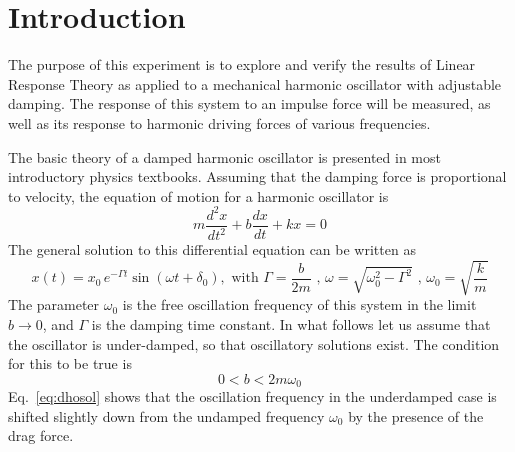 \documentclass{revtex4}
\begin{document}
%
%
%

\section{Introduction}

The purpose of this experiment is to explore and verify the results of
Linear Response Theory as applied to a mechanical harmonic oscillator with
adjustable damping.  The response of this system to an impulse force will
be measured, as well as its response to harmonic driving forces of various
frequencies.

The basic theory of a damped harmonic oscillator is presented in most
introductory physics textbooks.  Assuming that the damping force is
proportional to velocity, the equation of motion for a harmonic oscillator is
\begin{equation}
m\frac{d^2 x}{dt^2}+b\frac{dx}{dt} + kx = 0
\label{eq:dhodeq}
\end{equation}
The general solution to this differential equation can be written as
\begin{equation}
x(t)=x_0\, e^{-\Gamma t}\sin(\omega t+\delta_0) ,\mbox{~with~}
\Gamma=\frac{b}{2m} \mbox{~,~}
\omega=\sqrt{\omega_0^2-\Gamma^2} \mbox{~,~}
\omega_0=\sqrt{\frac{k}{m}}
\label{eq:dhosol}
\end{equation}
The parameter $\omega_0$ is the free oscillation frequency of this system
in the limit $b\rightarrow 0$, and $\Gamma$ is the damping time constant.
In what follows let us assume that the oscillator is under-damped, so that
oscillatory solutions exist. The condition for this to be true is
\begin{equation}
0 < b < 2m\omega_0
\end{equation}
Eq.~\ref{eq:dhosol} shows that the oscillation frequency in the underdamped
case is shifted slightly down from the undamped frequency $\omega_0$ by the
presence of the drag force. 
\end{document}
